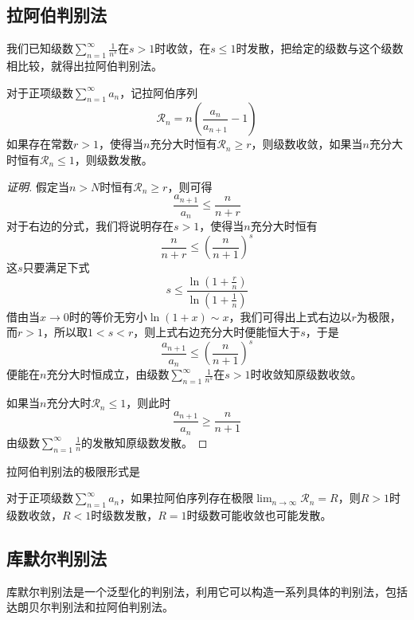 \subsection{拉阿伯判别法}
\label{sec:raabe-method-about-positive-series}

我们已知级数$\sum_{n=1}^{\infty}\frac{1}{n^s}$在$s>1$时收敛，在$s \leqslant 1$时发散，把给定的级数与这个级数相比较，就得出拉阿伯判别法。

\begin{theorem}[拉阿伯判别法]
  对于正项级数$\sum_{n=1}^{\infty}a_n$，记拉阿伯序列
  \[ \mathcal{R}_n = n \left( \frac{a_n}{a_{n+1}}-1 \right) \]
  如果存在常数$r>1$，使得当$n$充分大时恒有$\mathcal{R}_n \geqslant r$，则级数收敛，如果当$n$充分大时恒有$\mathcal{R}_n \leqslant 1$，则级数发散。
\end{theorem}

\begin{proof}[证明]
  假定当$n>N$时恒有$\mathcal{R}_n \geqslant r$，则可得
  \[ \frac{a_{n+1}}{a_n} \leqslant \frac{n}{n+r} \]
  对于右边的分式，我们将说明存在$s>1$，使得当$n$充分大时恒有
  \[ \frac{n}{n+r} \leqslant \left( \frac{n}{n+1} \right)^s \]
  这$s$只要满足下式
  \[ s \leqslant \frac{\ln{\left( 1+\frac{r}{n} \right)}}{\ln{\left( 1+\frac{1}{n} \right)}} \]
  借由当$x \to 0$时的等价无穷小$\ln(1+x) \sim x$，我们可得出上式右边以$r$为极限，而$r>1$，所以取$1<s<r$，则上式右边充分大时便能恒大于$s$，于是
  \[ \frac{a_{n+1}}{a_n} \leqslant \left( \frac{n}{n+1} \right)^s \]
  便能在$n$充分大时恒成立，由级数$\sum_{n=1}^{\infty}\frac{1}{n^s}$在$s>1$时收敛知原级数收敛。

  如果当$n$充分大时$\mathcal{R}_n \leqslant 1$，则此时
  \[ \frac{a_{n+1}}{a_n} \geqslant \frac{n}{n+1} \]
  由级数$\sum_{n=1}^{\infty}\frac{1}{n}$的发散知原级数发散。
\end{proof}

拉阿伯判别法的极限形式是
\begin{inference}
  对于正项级数$\sum_{n=1}^{\infty}a_n$，如果拉阿伯序列存在极限$\lim_{n \to \infty} \mathcal{R}_n=R$，则$R>1$时级数收敛，$R<1$时级数发散，$R=1$时级数可能收敛也可能发散。
\end{inference}

\subsection{库默尔判别法}
\label{sec:kummer-method-about-series-converage}

库默尔判别法是一个泛型化的判别法，利用它可以构造一系列具体的判别法，包括达朗贝尔判别法和拉阿伯判别法。

